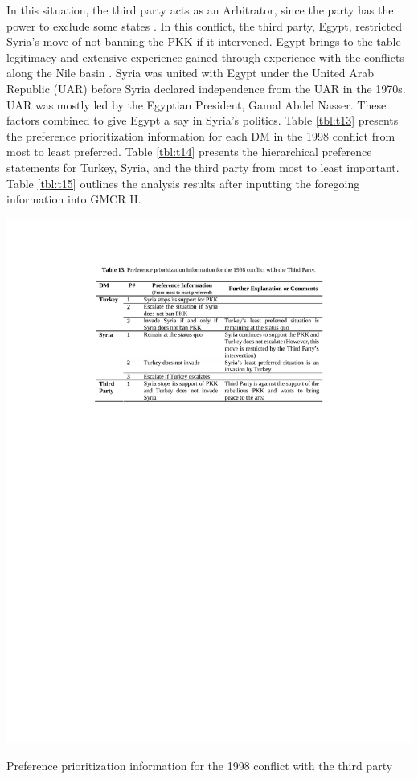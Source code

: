 \documentclass[letterpaper,12pt,titlepage,oneside,final]{book}
\begin{document}
In this situation, the third party acts as an Arbitrator, since the party has the power to exclude some states \citep{sakamoto2005}. In this conflict, the third party, Egypt, restricted Syria's move of not banning the PKK if it intervened. Egypt brings to the table legitimacy and extensive experience gained through experience with the conflicts along the Nile basin \citep{akanda2007tigris}. Syria was united with Egypt under the United Arab Republic (UAR) before Syria declared independence from the UAR in the 1970s. UAR was mostly led by the Egyptian President, Gamal Abdel Nasser. These factors combined to give Egypt a say in Syria's politics. Table \ref{tbl:t13} presents the preference prioritization information for each DM in the 1998 conflict from most to least preferred. Table \ref{tbl:t14} presents the hierarchical preference statements for Turkey, Syria, and the third party from most to least important. Table \ref{tbl:t15} outlines the analysis results after inputting the foregoing information into GMCR II. 

\begin{table}[H]
\centering
\includegraphics[scale=1]{PDF-IMG/tables/13.pdf}

\caption{Preference prioritization information for the 1998 conflict with the third party}

\label{tbl:t13}
\end{table}
\end{document}
